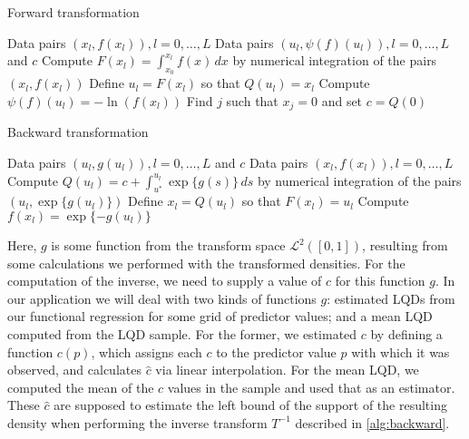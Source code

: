 \begin{algorithm}
    \caption{Forward transformation}
    \label{alg:forward}
    \begin{algorithmic}[1]
    \Require Data pairs \( (x_l, f(x_l)), l = 0, \ldots, L \)
    \Ensure Data pairs \( (u_l, \psi(f)(u_l)), l = 0, \ldots, L \) and \( c \)
        \State Compute \( F(x_l) = \int_{x_0}^{x_l} f(x) \, dx \) by numerical integration of the pairs \( (x_l, f(x_l)) \)
        \State Define \( u_l = F(x_l) \) so that \( Q(u_l) = x_l \)
        \State Compute \( \psi(f)(u_l) = -\ln(f(x_l)) \)
        \State Find \( j \) such that \( x_j = 0 \) and set \( c = Q(0) \)
    \EndFor
    \end{algorithmic}
\end{algorithm}

\begin{algorithm}
    \caption{Backward transformation}
    \label{alg:backward}
    \begin{algorithmic}[1]
    \Require Data pairs \( (u_l, g(u_l)), l = 0, \ldots, L \) and \( c \)
    \Ensure Data pairs \( (x_l, f(x_l)), l = 0, \ldots, L \)
        \State Compute \( Q(u_l) = c + \int_{u^*}^{u_l} \exp\{g(s)\} \, ds \) by numerical integration of the pairs \( (u_l, \exp\{g(u_l)\}) \)
        \State Define \( x_l = Q(u_l) \) so that \( F(x_l) = u_l \)
        \State Compute \( f(x_l) = \exp \{-g(u_l)\} \)
    \EndFor
    \end{algorithmic}
\end{algorithm}

Here, $g$ is some function from the transform space $\mathcal{L}^2([0,1])$,
resulting from some calculations we performed with the transformed densities. For
the computation of the inverse, we need to supply a value of $c$ for this function $g$.
In our application we will deal with two kinds of functions $g$: estimated LQDs from
our functional regression for some grid of predictor values; and a mean LQD computed from
the LQD sample. For the former, we estimated $c$ by defining a function $c(p)$, which
assigns each $c$ to the predictor value $p$ with which it was observed, and calculates $\hat{c}$
via linear interpolation. For the mean LQD, we computed the mean of the $c$ values in the sample
and used that as an estimator. These $\hat{c}$ are supposed to estimate the left bound
of the support of the resulting density when performing the inverse transform $T^{-1}$
described in \ref{alg:backward}.


